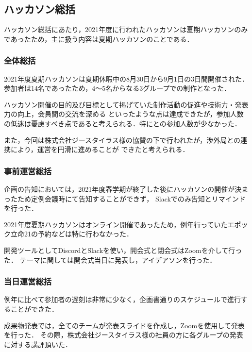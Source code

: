 \subsection*{ハッカソン総括}



ハッカソン総括にあたり，2021年度に行われたハッカソンは夏期ハッカソンのみであったため，主に扱う内容は夏期ハッカソンのことである．

\subsubsection*{全体総括}

2021年度夏期ハッカソンは夏期休暇中の8月30日から9月1日の3日間開催された．参加者は14名であったため，4〜5名からなる3グループでの制作となった．

ハッカソン開催の目的及び目標として掲げていた制作活動の促進や技術力・発表力の向上，会員間の交流を深める
といったような点は達成できたが，参加人数の低迷は憂慮すべき点であると考えられる．特に\firstGrade{}と\secondGrade{}の参加人数が少なかった．

また，今回は株式会社ジースタイラス様の協賛の下で行われたが，渉外局との連携により，運営を円滑に進めることが
できたと考えられる．

\subsubsection*{事前運営総括}

企画の告知においては，2021年度春学期が終了した後にハッカソンの開催が決まったため定例会議時にて告知することができず，
Slackでのみ告知とリマインドを行った．

2021年度夏期ハッカソンはオンライン開催であったため，例年行っていたエポック立命21の予約などは特に行わなかった．

開発ツールとしてDiscordとSlackを使い，開会式と閉会式はZoomを介して行った．
テーマに関しては開会式当日に発表し，アイデアソンを行った．

\subsubsection*{当日運営総括}

例年に比べて参加者の遅刻は非常に少なく，企画書通りのスケジュールで進行することができた．

成果物発表では，全てのチームが発表スライドを作成し，Zoomを使用して発表を行った．
その際，株式会社ジースタイラス様の社員の方に各グループの発表に対する講評頂いた．
